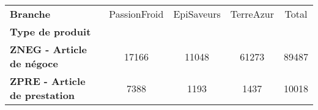 \begin{tabular}{lcccc}
\toprule
\textbf{Branche} &  PassionFroid &  EpiSaveurs &  TerreAzur &  Total \\
\textbf{Type de produit             } &               &             &            &        \\
\midrule
\textbf{ZNEG - Article de négoce    } &         17166 &       11048 &      61273 &  89487 \\
\textbf{ZPRE - Article de prestation} &          7388 &        1193 &       1437 &  10018 \\
\bottomrule
\end{tabular}
